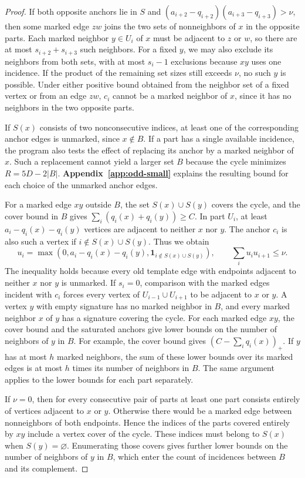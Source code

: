 \documentclass[preprint,11pt,numbers]{elsarticle-arxiv}
\numberwithin{equation}{section}
\theoremstyle{definition}
\begin{document}
\begin{proof}
If both opposite anchors lie in $S$ and
$(a_{i+2}-q_{i+2})(a_{i+3}-q_{i+3})>\nu$, then some marked
edge $zw$ joins the two sets of nonneighbors of $x$ in the
opposite parts. Each marked neighbor $y\in U_i$ of $x$ must
be adjacent to $z$ or $w$, so there are at most
$s_{i+2}+s_{i+3}$ such neighbors. For a fixed $y$, we may
also exclude its neighbors from both sets, with at most
$s_i-1$ exclusions because $xy$ uses one incidence. If the
product of the remaining set sizes still exceeds $\nu$, no
such $y$ is possible. Under either positive bound obtained
from the neighbor set of a fixed vertex or from an edge
$zw$, $c_i$ cannot be a marked neighbor of $x$, since it
has no neighbors in the two opposite parts.

If $S(x)$ consists of two nonconsecutive indices, at least one
of the corresponding anchor edges is unmarked, since $x\notin B$.
If a part has a single available incidence, the program also
tests the effect of replacing its anchor by a marked neighbor
of $x$. Such a replacement cannot yield a larger set $B$
because the cycle minimizes $R=5D-2|B|$.
\textbf{Appendix~\ref{app:odd-small}} explains the resulting
bound for each choice of the unmarked anchor edges.

For a marked edge $xy$ outside $B$, the set $S(x)\cup S(y)$
covers the cycle, and the cover bound in $B$ gives
$\sum_i(q_i(x)+q_i(y))\geq C$. In part $U_i$, at least
$a_i-q_i(x)-q_i(y)$ vertices are adjacent to neither $x$ nor
$y$. The anchor $c_i$ is also such a vertex if
$i\notin S(x)\cup S(y)$. Thus we obtain
\[
 u_i=\max(0,a_i-q_i(x)-q_i(y),\mathbf1_{i\notin S(x)\cup S(y)}),
 \qquad \sum_i u_i u_{i+1}\leq \nu.
\]
The inequality holds because every old template edge with
endpoints adjacent to neither $x$ nor $y$ is unmarked. If
$s_i=0$, comparison with the marked edges incident with $c_i$
forces every vertex of $U_{i-1}\cup U_{i+1}$ to be adjacent to
$x$ or $y$. A vertex $y$ with empty signature has no marked
neighbor in $B$, and every marked neighbor $x$ of $y$ has a
signature covering the cycle. For each marked edge $xy$,
the cover bound and the saturated anchors give lower bounds on
the number of neighbors of $y$ in $B$. For example, the
cover bound gives $(C-\sum_i q_i(x))_+$. If $y$ has at most
$h$ marked neighbors, the sum of these lower bounds over its
marked edges is at most $h$ times its number of neighbors in
$B$. The same argument applies to the lower bounds for each
part separately.

If $\nu=0$, then for every consecutive pair of parts at least
one part consists entirely of vertices adjacent to $x$ or $y$.
Otherwise there would be a marked edge between nonneighbors of
both endpoints. Hence the indices of the parts covered entirely
by $xy$ include a vertex cover of the cycle. These indices must
belong to $S(x)$ when $S(y)=\varnothing$. Enumerating those covers
gives further lower bounds on the number of neighbors of $y$
in $B$, which enter the count of incidences between $B$ and its
complement.


\end{proof}
\end{document}
